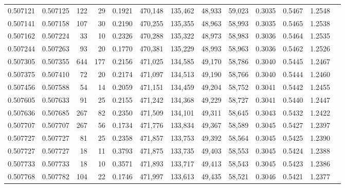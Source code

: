 \begin{tabular}{rrrrrrrrrrrrr}
0.507121 & 0.507125 &   122 &    29 &                                     0.1921 & 470,148 & 135,462 &  48,933 &  59,023 & 0.3035 & 0.5467 & 1.2548 \\
0.507141 & 0.507158 &   107 &    30 &                                     0.2190 & 470,255 & 135,355 &  48,963 &  58,993 & 0.3035 & 0.5465 & 1.2538 \\
0.507162 & 0.507224 &    33 &    10 &                                     0.2326 & 470,288 & 135,322 &  48,973 &  58,983 & 0.3036 & 0.5464 & 1.2535 \\
0.507244 & 0.507263 &    93 &    20 &                                     0.1770 & 470,381 & 135,229 &  48,993 &  58,963 & 0.3036 & 0.5462 & 1.2526 \\
0.507305 & 0.507355 &   644 &   177 &                                     0.2156 & 471,025 & 134,585 &  49,170 &  58,786 & 0.3040 & 0.5445 & 1.2467 \\
0.507375 & 0.507410 &    72 &    20 &                                     0.2174 & 471,097 & 134,513 &  49,190 &  58,766 & 0.3040 & 0.5444 & 1.2460 \\
0.507456 & 0.507588 &    54 &    14 &                                     0.2059 & 471,151 & 134,459 &  49,204 &  58,752 & 0.3041 & 0.5442 & 1.2455 \\
0.507605 & 0.507633 &    91 &    25 &                                     0.2155 & 471,242 & 134,368 &  49,229 &  58,727 & 0.3041 & 0.5440 & 1.2447 \\
0.507636 & 0.507685 &   267 &    82 &                                     0.2350 & 471,509 & 134,101 &  49,311 &  58,645 & 0.3043 & 0.5432 & 1.2422 \\
0.507707 & 0.507707 &   267 &    56 &                                     0.1734 & 471,776 & 133,834 &  49,367 &  58,589 & 0.3045 & 0.5427 & 1.2397 \\
0.507727 & 0.507727 &    81 &    25 &                                     0.2358 & 471,857 & 133,753 &  49,392 &  58,564 & 0.3045 & 0.5425 & 1.2390 \\
0.507727 & 0.507727 &    18 &    11 &                                     0.3793 & 471,875 & 133,735 &  49,403 &  58,553 & 0.3045 & 0.5424 & 1.2388 \\
0.507733 & 0.507733 &    18 &    10 &                                     0.3571 & 471,893 & 133,717 &  49,413 &  58,543 & 0.3045 & 0.5423 & 1.2386 \\
0.507768 & 0.507782 &   104 &    22 &                                     0.1746 & 471,997 & 133,613 &  49,435 &  58,521 & 0.3046 & 0.5421 & 1.2377 \\

\end{tabular}
